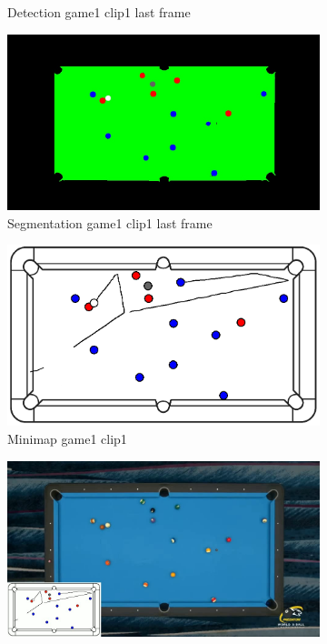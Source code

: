 \begin{figure}[H]
\begin{subfigure}[b]{0.48\textwidth}
        \caption{Detection game1 clip1 last frame}
        \label{fig: game1_clip1_last_frame_detected}
    \end{subfigure}
    \begin{subfigure}[b]{0.48\textwidth}
        \centering
        \includegraphics[width=\textwidth]{images/Segmentation/game1_clip1_segmented_balls_last_frame.jpg}
        \caption{Segmentation game1 clip1 last frame}
		\label{fig: game1_clip1_last_frame_segmented}
    \end{subfigure}
    \begin{subfigure}[b]{0.48\textwidth}
    	\centering
    	\includegraphics[width=\textwidth]{images/AllMinimap/game1_clip1_minimap.png}
    	\caption{Minimap game1 clip1}
    	\label{fig: game1_clip1_minimap}
    \end{subfigure}
    \begin{subfigure}[b]{0.48\textwidth}
    	\centering
    	\includegraphics[width=\textwidth]{images/Video/game1_clip1_video.jpg}

\end{subfigure}
\end{figure}

